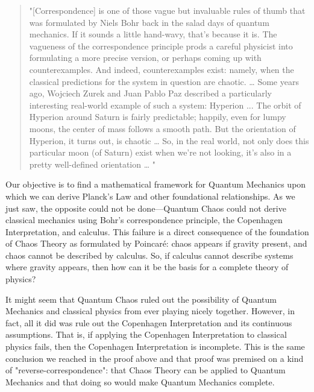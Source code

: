 \documentclass{report}
\begin{document}
\begin{quotation}
    "[Correspondence] is one of those vague but invaluable rules of thumb that was formulated by Niels Bohr back in the salad days of quantum mechanics. If it sounds a little hand-wavy, that’s because it is.
    \newline
    \newline
    The vagueness of the correspondence principle prods a careful physicist into formulating a more precise version, or perhaps coming up with counterexamples. And indeed, counterexamples exist: namely, when the classical predictions for the system in question are chaotic. \dots
    \newline
    \newline
    Some years ago, Wojciech Zurek and Juan Pablo Paz described a particularly interesting real-world example of such a system: Hyperion ... The orbit of Hyperion around Saturn is fairly predictable; happily, even for lumpy moons, the center of mass follows a smooth path. But the orientation of Hyperion, it turns out, is chaotic \dots
    \newline
    \newline
    So, in the real world, not only does this particular moon (of Saturn) exist when we’re not looking, it’s also in a pretty well-defined orientation \dots
    "\cite{CarrollHyperion}
\end{quotation}

Our objective is to find a mathematical framework for Quantum Mechanics upon which we can derive Planck's Law and other foundational relationships. As we just saw, the opposite could not be done—Quantum Chaos could not derive classical mechanics using Bohr's correspondence principle, the Copenhagen Interpretation, and calculus. This failure is a direct consequence of the foundation of Chaos Theory as formulated by Poincar\'e: chaos appears if gravity present, and chaos cannot be described by calculus. So, if calculus cannot describe systems where gravity appears, then how can it be the basis for a complete theory of physics?

It might seem that Quantum Chaos ruled out the possibility of Quantum Mechanics and classical physics from ever playing nicely together. However, in fact, all it did was rule out the Copenhagen Interpretation and its continuous assumptions. That is, if applying the Copenhagen Interpretation to classical physics fails, then the Copenhagen Interpretation is incomplete. This is the same conclusion we reached in the proof above and that proof was premised on a kind of "reverse-correspondence": that Chaos Theory can be applied to Quantum Mechanics and that doing so would make Quantum Mechanics complete.
\end{document}
